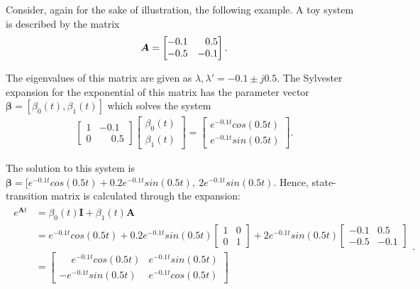 \documentclass[a4paper,11pt]{book}
\numberwithin{figure}{chapter}
\numberwithin{equation}{chapter}
\numberwithin{table}{chapter}
\theoremstyle{definition}
\newtheorem{example}{Example}[chapter]
\newcounter{boxed-theorem}
\newcounter{boxed-lemma}
\newcounter{boxed-definition}
\newcounter{boxed-example}
\newenvironment{boxed-example}[1]
{\colorlet{shadecolor}{pastelRed!15} \begin{shaded} \begin{example}{#1}}
{\end{example} \end{shaded}}
\begin{document}
\begin{boxed-example}{} \label{ex:stateTrans02}
	Consider, again for the sake of illustration, the following example. A toy system is described by the matrix
	\begin{align} \label{eq:stateRespEx02}
	    \bm{A} = \begin{bmatrix} 
	         -0.1  &  \hfill 0.5 \\
	        -0.5   &  -0.1 
	    \end{bmatrix}
	.\end{align}
	
	\noindent The eigenvalues of this matrix are given as $\lambda, \lambda' = -0.1 \pm j0.5$. The Sylvester expansion for the exponential of this matrix has the parameter vector $\bm{\beta} = [\beta_0(t), \beta_1(t)]$ which solves the system
	\begin{align}
	\begin{bmatrix}
		1 & -0.1 \\ 0 & \phantom{-} 0.5
	\end{bmatrix} \begin{bmatrix}
		\beta_0(t) \\ \beta_1(t)
	\end{bmatrix} = \begin{bmatrix}
		e^{-0.1t} cos(0.5 t) \\ e^{-0.1t} sin(0.5 t)
	\end{bmatrix}
	.\end{align}
	
	\noindent The solution to this system is $\bm{\beta} = [e^{-0.1t}cos(0.5 t) + 0.2e^{-0.1 t} sin(0.5 t),\ 2 e^{-0.1 t} sin(0.5 t)$. Hence, state-transition matrix is calculated through the expansion:
	\begin{align}
	\begin{split}
		e^{\bm{A} t} & = \beta_0(t) \bm{I} + \beta_1(t) \bm{A} \\ & = e^{-0.1t}cos(0.5 t) + 0.2e^{-0.1 t} sin(0.5 t) \begin{bmatrix} 1 & 0 \\ 0 & 1 \end{bmatrix} + 2 e^{-0.1 t} sin(0.5 t) \begin{bmatrix} -0.1  & 0.5 \\ -0.5  & -0.1 \end{bmatrix} \\
		& =  \begin{bmatrix} \phantom{-}e^{-0.1t} cos(0.5 t) & e^{-0.1t} sin(0.5 t) \\ -e^{-0.1t} sin(0.5 t) & e^{-0.1t} cos(0.5 t) \end{bmatrix} \\
	\end{split}
	.\end{align}
\end{boxed-example}
	
\end{document}
